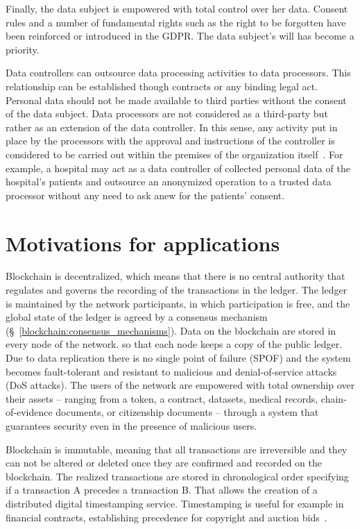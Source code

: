 Finally, the data subject is empowered with total control over her data. Consent rules and a number of fundamental rights such as the right to be forgotten have been reinforced or introduced in the GDPR. The data subject's will has become a priority.

Data controllers can outsource data processing activities to data processors. This relationship can be established though contracts or any binding legal act. Personal data should not be made available to third parties without the consent of the data subject. Data processors are not considered as a third-party but rather as an extension of the data controller. In this sense, any activity put in place by the processors with the approval and instructions of the controller is considered to be carried out within the premises of the organization itself~\cite{mhmd}. For example, a hospital may act as a data controller of collected personal data of the hospital's patients and outsource an anonymized operation to a trusted data processor without any need to ask anew for the patients' consent.

\section{Motivations for applications}\label{problem:motivations}

Blockchain is decentralized, which means that there is no central authority that regulates and governs the recording of the transactions in the ledger. The ledger is maintained by the network participants, in which participation is free, and the global state of the ledger is agreed by a consensus mechanism (§~\ref{blockchain:consensus_mechanisms}). Data on the blockchain are stored in every node of the network. so that each node keeps a copy of the public ledger. Due to data replication there is no single point of failure (SPOF) and the system becomes fault-tolerant and resistant to malicious and denial-of-service attacks (DoS attacks). The users of the network are empowered with total ownership over their assets -- ranging from a token, a contract, datasets, medical records, chain-of-evidence documents, or citizenship documents -- through a system that guarantees security even in the presence of malicious users.

Blockchain is immutable, meaning that all transactions are irreversible and they can not be altered or deleted once they are confirmed and recorded on the blockchain. The realized transactions are stored in chronological order specifying if a transaction A precedes a transaction B. That allows the creation of a distributed digital timestamping service. Timestamping is useful for example in financial contracts, establishing precedence for copyright and auction bids~\cite{bl_auditability}.

